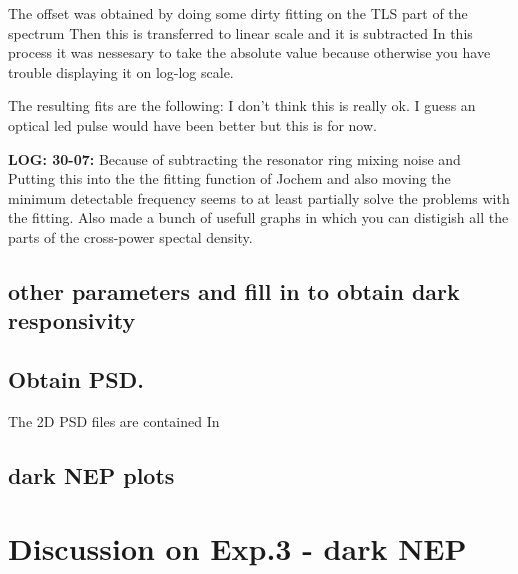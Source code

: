 The offset was obtained by doing some dirty fitting on the TLS part of the spectrum
Then this is transferred to linear scale and it is subtracted
In this process it was nessesary to take the absolute value because otherwise you have trouble displaying it on log-log scale.

The resulting fits are the following:
I don't think this is really ok. I guess an optical led pulse would have been better but this is for now.

\textbf{LOG: 30-07:} Because of subtracting the resonator ring mixing noise and 
Putting this into the the fitting function of Jochem and also moving the minimum detectable frequency seems to at least partially solve the problems with the fitting. Also made a bunch of usefull graphs in which you can distigish all the parts of the cross-power spectal density.





\FloatBarrier

\subsection*{other parameters and fill in to obtain dark responsivity}

\subsection*{Obtain PSD.}

The 2D PSD files are contained In







\subsection*{dark NEP plots}


\section{Discussion on Exp.3 - dark NEP} 



